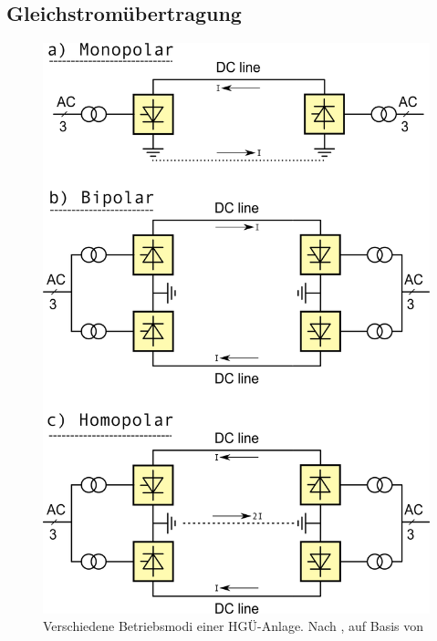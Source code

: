\subsection{Gleichstromübertragung}

\begin{figure}[tbhn]
\begin{center}
\noindent
\includegraphics[scale=0.2]{Hvdc_ALL_schematic.png}
\end{center}
\caption{Verschiedene Betriebsmodi einer HGÜ-Anlage. Nach \cite{Padiyar}, auf Basis von \cite{WPfehlt}}
\label{pic:HVDCtypen}
\end{figure}

